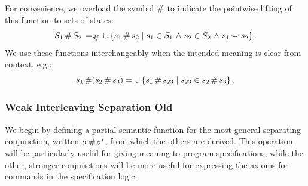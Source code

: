 \documentclass[11pt]{article}
\begin{document}
For convenience, we overload the symbol $\operatorname{\#}$ to indicate the pointwise lifting of this function to sets of states: \[ S_1 \operatorname{\#} S_2 \operatorname{\;=_{\mathit{df}}\;} \cup \left\lbrace s_1 \operatorname{\#} s_2 \mid s_1 \in S_1 \operatorname{\,\wedge\,} s_2 \in S_2 \operatorname{\,\wedge\,} s_1 \operatorname{\smile} s_2 \right\rbrace.\] We use these functions interchangeably when the intended meaning is clear from context, e.g.: \[ s_1 \operatorname{\#} (s_2 \operatorname{\#} s_3) = \cup \left\lbrace s_1 \operatorname{\#} s_{23} \mid s_{23} \in s_2 \operatorname{\#} s_3 \right\rbrace.\]


\subsubsection{Weak Interleaving Separation Old}

We begin by defining a partial semantic function for the most general separating conjunction, written $\sigma \operatorname{\#} \sigma'$, from which the others are derived. This operation will be particularly useful for giving meaning to program specifications, while the other, stronger conjunctions will be more useful for expressing the axioms for commands in the specification logic. 
\end{document}
